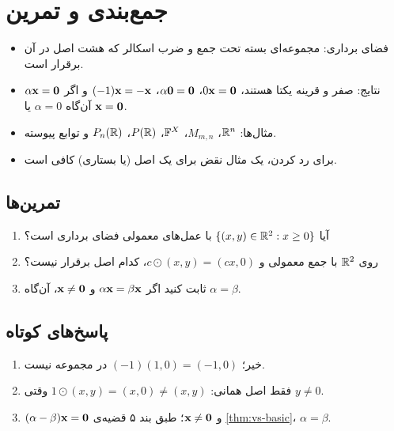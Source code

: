 \section{جمع‌بندی و تمرین}

\begin{summary}
\begin{itemize}
  \item فضای برداری: مجموعه‌ای بسته تحت جمع و ضرب اسکالر که هشت اصل در آن برقرار است.
  \item نتایج: صفر و قرینه یکتا هستند، $0\mathbf{x}=\mathbf{0}$، $\alpha\mathbf{0}=\mathbf{0}$، $(-1)\mathbf{x}=-\mathbf{x}$ و اگر $\alpha\mathbf{x}=\mathbf{0}$ آن‌گاه $\alpha=0$ یا $\mathbf{x}=\mathbf{0}$.
  \item مثال‌ها: $\mathbb{R}^n$، $M_{m,n}$، $\mathbb{F}^X$، $P(\mathbb{R})$، $P_n(\mathbb{R})$ و توابع پیوسته.
  \item برای رد کردن، یک مثال نقض برای یک اصل (یا بستاری) کافی است.
\end{itemize}
\end{summary}

\subsection*{تمرین‌ها}
\begin{enumerate}
  \item آیا $\{(x,y)\in\mathbb{R}^2: x\ge0\}$ با عمل‌های معمولی فضای برداری است؟
  \item روی $\mathbb{R}^2$ با جمع معمولی و $c\odot(x,y)=(cx,0)$، کدام اصل برقرار نیست؟
  \item ثابت کنید اگر $\alpha\mathbf{x}=\beta\mathbf{x}$ و $\mathbf{x}\neq\mathbf{0}$، آن‌گاه $\alpha=\beta$.
\end{enumerate}

\subsection*{پاسخ‌های کوتاه}
\begin{enumerate}
  \item خیر؛ $(-1)(1,0)=(-1,0)$ در مجموعه نیست.
  \item فقط اصل همانی: $1\odot(x,y)=(x,0)\neq(x,y)$ وقتی $y\neq0$.
  \item $(\alpha-\beta)\mathbf{x}=\mathbf{0}$ و $\mathbf{x}\neq\mathbf{0}$؛ طبق بند ۵ قضیه‌ی \ref{thm:vs-basic}، $\alpha=\beta$.
\end{enumerate}
